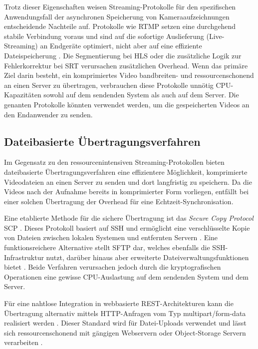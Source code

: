 Trotz dieser Eigenschaften weisen Streaming-Protokolle für den spezifischen Anwendungsfall der asynchronen Speicherung von Kameraaufzeichnungen entscheidende Nachteile auf. Protokolle wie RTMP setzen eine durchgehend stabile Verbindung 
voraus und sind auf die sofortige Auslieferung (Live-Streaming) an Endgeräte optimiert, nicht aber auf eine effiziente Dateispeicherung \parencite{skavish_2022_ein}. Die Segmentierung bei HLS oder die 
zusätzliche Logik zur Fehlerkorrektur bei SRT verursachen zusätzlichen Overhead. Wenn das primäre Ziel darin besteht, ein komprimiertes Video bandbreiten- und ressourcenschonend an einen Server zu übertragen, 
verbrauchen diese Protokolle unnötig CPU-Kapazitäten sowohl auf dem sendenden System als auch auf dem Server. Die genanten Protokolle könnten verwendet werden, um die gespeicherten Videos an den Endanwender zu senden. 

\subsection{Dateibasierte Übertragungsverfahren}

Im Gegensatz zu den ressourcenintensiven Streaming-Protokollen bieten dateibasierte Übertragungsverfahren eine effizientere Möglichkeit, komprimierte Videodateien an einen Server zu senden und dort langfristig zu speichern. Da die Videos nach der 
Aufnahme bereits in komprimierter Form vorliegen, entfällt bei einer solchen Übertragung der Overhead für eine Echtzeit-Synchronisation.\newline

Eine etablierte Methode für die sichere Übertragung ist das \textit{Secure Copy Protocol} SCP \parencite{_2020_scp, _2025_scp}. Dieses Protokoll basiert auf SSH und ermöglicht eine verschlüsselte Kopie von Dateien zwischen lokalen Systemen und entfernten 
Servern \parencite{ylonen_2006_rfc, _2020_scp}. Eine funktionsreichere Alternative stellt SFTP dar, welches ebenfalls die SSH-Infrastruktur nutzt, darüber hinaus aber erweiterte Dateiverwaltungsfunktionen bietet 
\parencite{_2025_sftp}. Beide Verfahren verursachen jedoch durch die kryptografischen Operationen eine gewisse CPU-Auslastung auf dem sendenden System und dem Server.\newline  

Für eine nahtlose Integration in webbasierte REST-Architekturen kann die Übertragung alternativ mittels HTTP-Anfragen vom Typ multipart/form-data realisiert werden \parencite{_2026_file, muhibullah_2024_understanding}. 
Dieser Standard wird für Datei-Uploads verwendet und lässt sich ressourcenschonend mit gängigen Webservern oder Object-Storage Servern verarbeiten \parencite{muhibullah_2024_understanding}.\newline  

